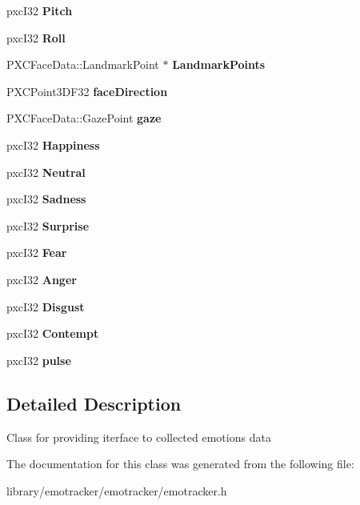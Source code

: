 \begin{DoxyCompactItemize}
pxc\+I32 {\bfseries Pitch}
\item 
\mbox{\label{class_emotions_data_ab04d85363319c32712fdd923783e55fd}} 
pxc\+I32 {\bfseries Roll}
\item 
\mbox{\label{class_emotions_data_aee83409e29e73dd7bfc74681aa435767}} 
P\+X\+C\+Face\+Data\+::\+Landmark\+Point $\ast$ {\bfseries Landmark\+Points}
\item 
\mbox{\label{class_emotions_data_ae531fa64f7c952d7a29f7edba954c2db}} 
P\+X\+C\+Point3\+D\+F32 {\bfseries face\+Direction}
\item 
\mbox{\label{class_emotions_data_a1fffe8cd18a4e2348ed91fbad34b3bcf}} 
P\+X\+C\+Face\+Data\+::\+Gaze\+Point {\bfseries gaze}
\item 
\mbox{\label{class_emotions_data_a3f1b53e5d38a56a29771396e65e1a3d5}} 
pxc\+I32 {\bfseries Happiness}
\item 
\mbox{\label{class_emotions_data_a2221e46c2cb2ace526c23907c8b06e15}} 
pxc\+I32 {\bfseries Neutral}
\item 
\mbox{\label{class_emotions_data_a1d19a92b823126e8e9f00c113b5a30d3}} 
pxc\+I32 {\bfseries Sadness}
\item 
\mbox{\label{class_emotions_data_a1d76b91b6eadde2d9467e552caa6dd6e}} 
pxc\+I32 {\bfseries Surprise}
\item 
\mbox{\label{class_emotions_data_a1897b3bf970af6eaa0e121c06f4dfd1c}} 
pxc\+I32 {\bfseries Fear}
\item 
\mbox{\label{class_emotions_data_a5b519c26dcd6ba388998c0a55f01fb40}} 
pxc\+I32 {\bfseries Anger}
\item 
\mbox{\label{class_emotions_data_aec9b0b600bc073efa83ef62d4a297712}} 
pxc\+I32 {\bfseries Disgust}
\item 
\mbox{\label{class_emotions_data_a519e1c42d3fca00834e761d7036315ad}} 
pxc\+I32 {\bfseries Contempt}
\item 
\mbox{\label{class_emotions_data_a3ee4f613c93602351598028bd4f79de7}} 
pxc\+I32 {\bfseries pulse}
\end{DoxyCompactItemize}


\subsection{Detailed Description}
Class for providing iterface to collected emotions data 

The documentation for this class was generated from the following file\+:\begin{DoxyCompactItemize}
\item 
library/emotracker/emotracker/emotracker.\+h\end{DoxyCompactItemize}

